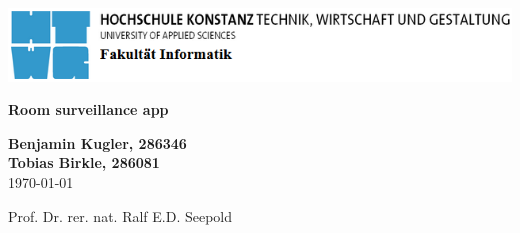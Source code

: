 \begin{titlepage}

	\includegraphics[width=1.00\textwidth]{images/HTWG_logo.PNG}

	\vspace*{1cm}
	\begin{center}
		\Huge
		\vspace{2cm}
		\textbf{Room surveillance app} \\
		\vspace{1cm}
		\large
		
		\vspace{1cm}
		\textbf{Benjamin Kugler, 286346} \\
		\textbf{Tobias Birkle, 286081} \\
		\today\\
		\vspace{2cm}
		
		
		Prof. Dr. rer. nat. Ralf E.D. Seepold\\
		

		
	\end{center}
	\normalsize
	\vfill
\end{titlepage}
